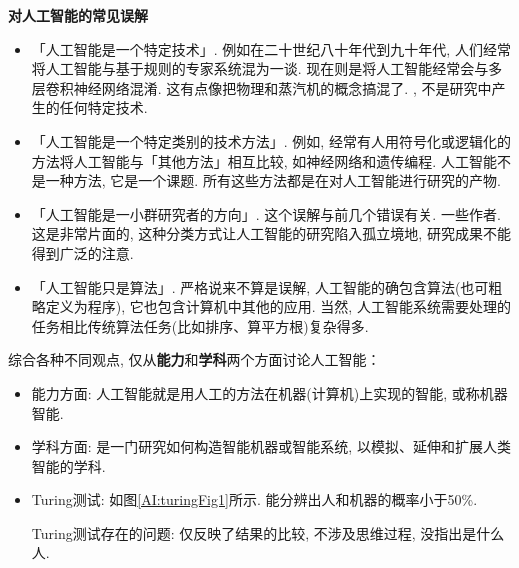 \textbf{对人工智能的常见误解}
\begin{itemize}
\item 「人工智能是一个特定技术」. 例如在二十世纪八十年代到九十年代, 人们经常将人工智能与基于规则的专家系统混为一谈. 现在则是将人工智能经常会与多层卷积神经网络混淆. 这有点像把物理和蒸汽机的概念搞混了. , 不是研究中产生的任何特定技术.
\item 「人工智能是一个特定类别的技术方法」. 例如, 经常有人用符号化或逻辑化的方法将人工智能与「其他方法」相互比较, 如神经网络和遗传编程. 人工智能不是一种方法, 它是一个课题. 所有这些方法都是在对人工智能进行研究的产物.
\item 「人工智能是一小群研究者的方向」. 这个误解与前几个错误有关. 一些作者. 这是非常片面的, 这种分类方式让人工智能的研究陷入孤立境地, 研究成果不能得到广泛的注意.
\item 「人工智能只是算法」. 严格说来不算是误解, 人工智能的确包含算法(也可粗略定义为程序), 它也包含计算机中其他的应用. 当然, 人工智能系统需要处理的任务相比传统算法任务(比如排序、算平方根)复杂得多.
\end{itemize}
综合各种不同观点, 仅从\textbf{能力}和\textbf{学科}两个方面讨论人工智能：
\begin{itemize}
\item 能力方面: 人工智能就是用人工的方法在机器(计算机)上实现的智能, 或称机器智能.
\item 学科方面: 是一门研究如何构造智能机器或智能系统, 以模拟、延伸和扩展人类智能的学科.
\item Turing测试: 如图\ref{AI:turingFig1}所示. 能分辨出人和机器的概率小于50\%.
\begin{remark}
  Turing测试存在的问题: 仅反映了结果的比较, 不涉及思维过程, 没指出是什么人.
\end{remark}
\end{itemize}

